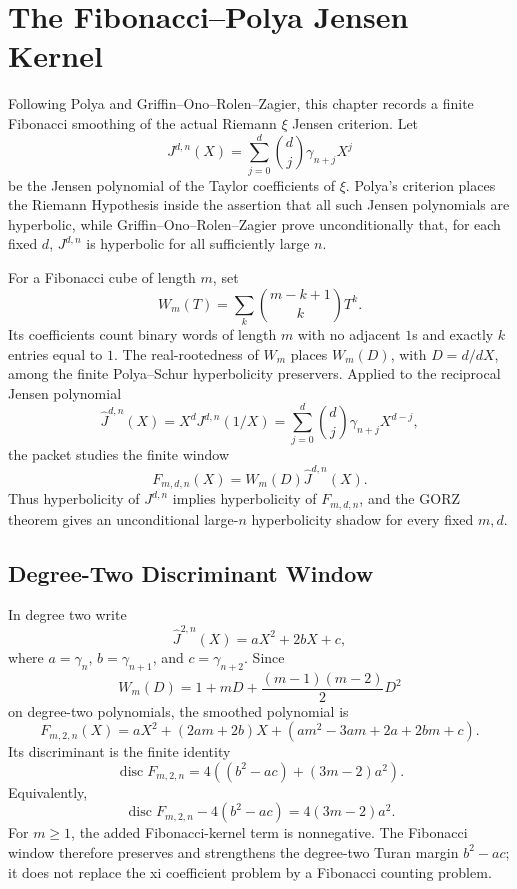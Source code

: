 \chapter{The Fibonacci--Polya Jensen Kernel}
\label{ch:concrete-instances-fibonacci-polya-jensen-kernel}

Following Polya and Griffin--Ono--Rolen--Zagier, this chapter records a finite Fibonacci smoothing of the actual Riemann $\xi$ Jensen criterion. Let
$$
J^{d,n}(X)=\sum_{j=0}^{d}\binom{d}{j}\gamma_{n+j}X^j
$$
be the Jensen polynomial of the Taylor coefficients of $\xi$. Polya's criterion places the Riemann Hypothesis inside the assertion that all such Jensen polynomials are hyperbolic, while Griffin--Ono--Rolen--Zagier prove unconditionally that, for each fixed $d$, $J^{d,n}$ is hyperbolic for all sufficiently large $n$.

For a Fibonacci cube of length $m$, set
$$
W_m(T)=\sum_k \binom{m-k+1}{k}T^k.
$$
Its coefficients count binary words of length $m$ with no adjacent $1$s and exactly $k$ entries equal to $1$. The real-rootedness of $W_m$ places $W_m(D)$, with $D=d/dX$, among the finite Polya--Schur hyperbolicity preservers. Applied to the reciprocal Jensen polynomial
$$
\widehat J^{d,n}(X)=X^dJ^{d,n}(1/X)=\sum_{j=0}^{d}\binom{d}{j}\gamma_{n+j}X^{d-j},
$$
the packet studies the finite window
$$
F_{m,d,n}(X)=W_m(D)\widehat J^{d,n}(X).
$$
Thus hyperbolicity of $J^{d,n}$ implies hyperbolicity of $F_{m,d,n}$, and the GORZ theorem gives an unconditional large-$n$ hyperbolicity shadow for every fixed $m,d$.

\section{Degree-Two Discriminant Window}
\label{sec:fibonacci-polya-jensen-degree-two}

In degree two write
$$
\widehat J^{2,n}(X)=aX^2+2bX+c,
$$
where $a=\gamma_n$, $b=\gamma_{n+1}$, and $c=\gamma_{n+2}$. Since
$$
W_m(D)=1+mD+\frac{(m-1)(m-2)}{2}D^2
$$
on degree-two polynomials, the smoothed polynomial is
$$
F_{m,2,n}(X)=aX^2+(2am+2b)X+(am^2-3am+2a+2bm+c).
$$
Its discriminant is the finite identity
$$
\operatorname{disc}F_{m,2,n}
=4\left((b^2-ac)+(3m-2)a^2\right).
$$
Equivalently,
$$
\operatorname{disc}F_{m,2,n}-4(b^2-ac)=4(3m-2)a^2.
$$
For $m\ge 1$, the added Fibonacci-kernel term is nonnegative. The Fibonacci window therefore preserves and strengthens the degree-two Turan margin $b^2-ac$; it does not replace the xi coefficient problem by a Fibonacci counting problem.

